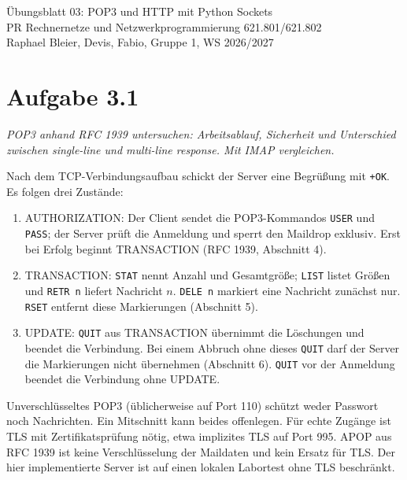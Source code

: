 \documentclass[a4paper,11pt]{article}
\newif\ifexplain
\newcommand{\aufgabe}[1]{\section*{Aufgabe #1}}
\newcommand{\angabe}[1]{\textit{#1}\par\smallskip}
\newcommand{\explain}[1]{\ifexplain\begin{erklbox}#1\end{erklbox}\fi}
\newcommand{\explainfig}[1]{\ifexplain\begin{center}#1\end{center}\fi}
\begin{document}
\begin{center}
{\Large Übungsblatt 03: POP3 und HTTP mit Python Sockets}\\
PR Rechnernetze und Netzwerkprogrammierung 621.801/621.802\\
Raphael Bleier, Devis, Fabio, Gruppe 1, WS 2026/2027
\end{center}

\aufgabe{3.1}
\angabe{POP3 anhand RFC 1939 untersuchen: Arbeitsablauf, Sicherheit und Unterschied zwischen single-line und multi-line response. Mit IMAP vergleichen.}

Nach dem TCP-Verbindungsaufbau schickt der Server eine Begrüßung mit \texttt{+OK}. Es folgen drei Zustände:
\begin{enumerate}
\item AUTHORIZATION: Der Client sendet die POP3-Kommandos \texttt{USER} und \texttt{PASS}; der Server prüft die Anmeldung und sperrt den Maildrop exklusiv. Erst bei Erfolg beginnt TRANSACTION (RFC 1939, Abschnitt 4).
\item TRANSACTION: \texttt{STAT} nennt Anzahl und Gesamtgröße; \texttt{LIST} listet Größen und \texttt{RETR n} liefert Nachricht $n$. \texttt{DELE n} markiert eine Nachricht zunächst nur. \texttt{RSET} entfernt diese Markierungen (Abschnitt 5).
\item UPDATE: \texttt{QUIT} aus TRANSACTION übernimmt die Löschungen und beendet die Verbindung. Bei einem Abbruch ohne dieses \texttt{QUIT} darf der Server die Markierungen nicht übernehmen (Abschnitt 6). \texttt{QUIT} vor der Anmeldung beendet die Verbindung ohne UPDATE.
\end{enumerate}
\explain{Der Maildrop ist hier der Vorrat an Nachrichten eines Benutzers. Die Sperre verhindert, dass zwei Sitzungen gleichzeitig verschiedene Löschstände auf denselben Vorrat anwenden. Abrufen heißt noch nicht Löschen: Das sind getrennte Kommandos.}

\explainfig{\begin{tikzpicture}[every node/.style={draw,rounded corners,align=center,font=\small},>=stealth]
\node (a) at (0,0) {AUTHORIZATION};
\node (t) at (5,0) {TRANSACTION};
\node (u) at (10,0) {UPDATE};
\draw[->] (a)--node[above,draw=none]{Login und Lock}(t);
\draw[->] (t)--node[above,draw=none]{QUIT}(u);
\end{tikzpicture}}

Unverschlüsseltes POP3 (üblicherweise auf Port 110) schützt weder Passwort noch Nachrichten. Ein Mitschnitt kann beides offenlegen. Für echte Zugänge ist TLS mit Zertifikatsprüfung nötig, etwa implizites TLS auf Port 995. APOP aus RFC 1939 ist keine Verschlüsselung der Maildaten und kein Ersatz für TLS. Der hier implementierte Server ist auf einen lokalen Labortest ohne TLS beschränkt.
\explain{Authentifizierung und Verschlüsselung lösen verschiedene Probleme. Ein richtig geprüftes Passwort verhindert nicht, dass jemand den unverschlüsselten Transport mitliest. Deshalb werden im Versuch ausschließlich die vorgegebenen Testdaten verwendet.}
\end{document}
